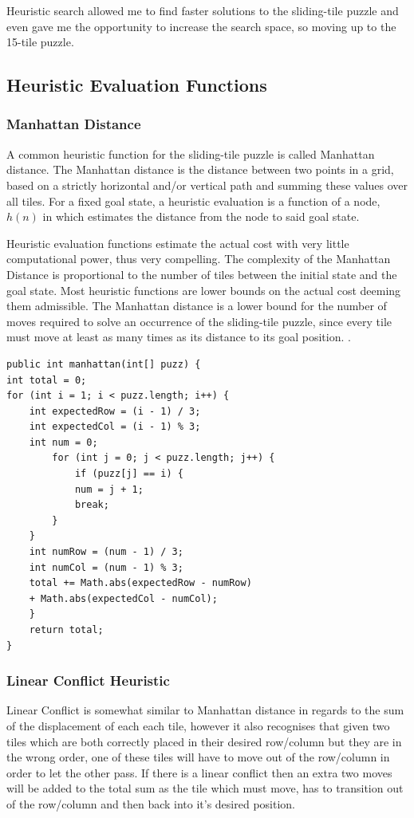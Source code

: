 \documentclass[progress]{cmpreport}
\begin{document}
 

Heuristic search allowed me to find faster solutions to the sliding-tile puzzle and even gave me the opportunity to increase the search space, so moving up to the 15-tile puzzle.

\subsection{Heuristic Evaluation Functions}
\subsubsection{Manhattan Distance}
A common heuristic function for the sliding-tile puzzle is called Manhattan distance. The Manhattan distance is the distance between two points in a grid, based on a strictly horizontal and/or vertical path and summing these values over all tiles. For a fixed goal state, a heuristic evaluation is a function of a node, $h(n)$ in which estimates the distance from the node to said goal state.


Heuristic evaluation functions estimate the actual cost with very little computational power, thus very compelling. The complexity of the Manhattan Distance is proportional to the number of tiles between the initial state and the goal state. Most heuristic functions are lower bounds on the actual cost deeming them admissible. The Manhattan distance is a lower bound for the number of moves required to solve an occurrence of the sliding-tile puzzle, since every tile must move at least as many times as its distance to its goal position. \citep{DBLP:conf/ccgrid/LinnertSB14}.

\begin{verbatim}
public int manhattan(int[] puzz) {
int total = 0;
for (int i = 1; i < puzz.length; i++) {
    int expectedRow = (i - 1) / 3;
    int expectedCol = (i - 1) % 3;
    int num = 0;
        for (int j = 0; j < puzz.length; j++) {
            if (puzz[j] == i) {
            num = j + 1;
            break;
        }    
    }
    int numRow = (num - 1) / 3;
    int numCol = (num - 1) % 3;
    total += Math.abs(expectedRow - numRow)
    + Math.abs(expectedCol - numCol);
    }
    return total;
}
\end{verbatim}
\subsubsection{Linear Conflict Heuristic}
Linear Conflict is somewhat similar to Manhattan distance in regards to the sum of the displacement of each each tile, however it also recognises that given two tiles which are both correctly placed in their desired row/column but they are in the wrong order, one of these tiles will have to move out of the row/column in order to let the other pass. If there is a linear conflict then an extra two moves will be added to the total sum as the tile which must move, has to transition out of the row/column and then back into it's desired position.
\end{document}
